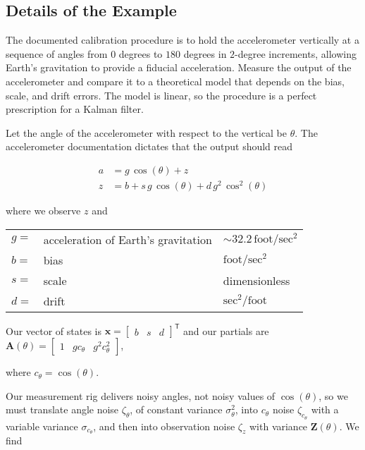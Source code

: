\documentclass[10pt,oneside,x11names]{article}
\begin{document}
\subsection{Details of the Example}
\label{sec:orgheadline23}

The documented calibration procedure is to hold the accelerometer vertically at
a sequence of angles from \(0\) degrees to \(180\) degrees in \(2\)-degree
increments, allowing Earth's gravitation to provide a fiducial acceleration.
Measure the output of the accelerometer and compare it to a theoretical model
that depends on the bias, scale, and drift errors. The model is linear, so the
procedure is a perfect prescription for a Kalman filter.

Let the angle of the accelerometer with respect to the vertical be \(\theta\). The
accelerometer documentation dictates that the output should read

\begin{align}
a &= g \,\cos(\theta) + z \\
\label{eqn:accelerometer-observations}
z &= b + s\, g\, \cos(\theta) + d\, g^2 \,\cos^2(\theta)
\end{align}

\noindent where we observe \(z\) and

\begin{center}
\begin{tabular}{lll}
\(g=\) & acceleration of Earth's gravitation & \(\sim 32.2 \,\textrm{foot}/\textrm{sec}^2\)\\
\(b=\) & bias & \(\textrm{foot} / \textrm{sec}^2\)\\
\(s=\) & scale & dimensionless\\
\(d=\) & drift & \(\textrm{sec}^2 / \textrm{foot}\)\\
\end{tabular}
\end{center}

Our vector of states is
\(\mathbold{x}=\begin{bmatrix}b&s&d\end{bmatrix}^{\mathsf{T}}\) and our partials are
\(\mathbold{A}(\theta)=\begin{bmatrix}1&gc_\theta&g^2c^2_\theta\end{bmatrix}\),

\noindent where \(c_\theta=\cos(\theta)\).

Our measurement rig delivers noisy angles, not noisy values of \(\cos(\theta)\),
so we must translate angle noise \(\zeta_\theta\), of constant variance
\(\sigma_\theta^2\), into \(c_\theta\) noise \(\zeta_{c_\theta}\) with a variable
variance \(\sigma_{c_\theta}\), and then into observation noise \(\zeta_z\) with
variance \(\mathbold{Z}(\theta)\). We find
\end{document}
